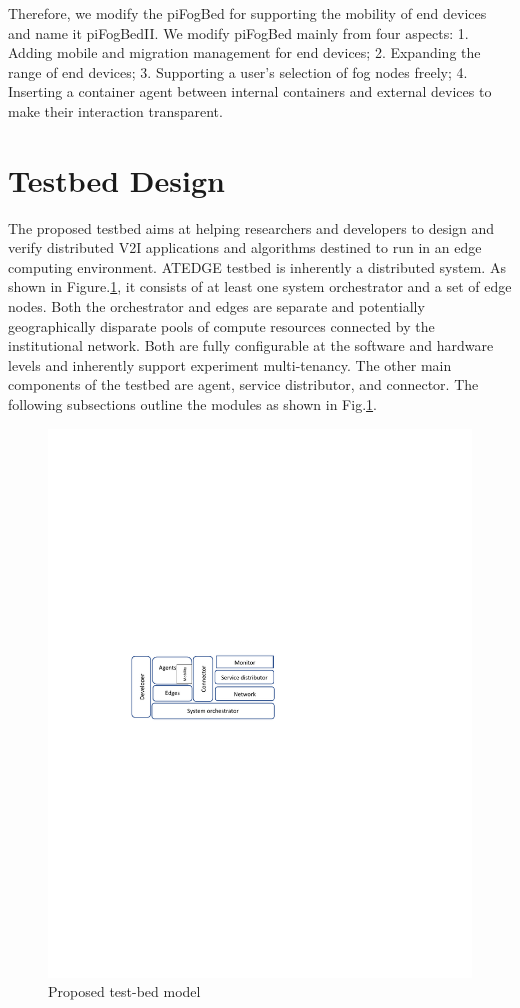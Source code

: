 \documentclass[conference]{IEEEtran}
\begin{document}
Therefore, we modify the piFogBed\cite{xu2020support} for supporting the mobility of end devices and name it
piFogBedII. We modify piFogBed mainly from four aspects:
1. Adding mobile and migration management for end devices;
2. Expanding the range of end devices;
3. Supporting a user’s selection of fog nodes freely;
4. Inserting a container agent between internal containers and external devices to make their
interaction transparent.
\section{Testbed Design}
\par The proposed testbed aims at helping researchers and developers to design and verify distributed
V2I applications and algorithms destined to run in an edge computing environment. ATEDGE testbed is inherently a distributed system. As shown in Figure.\ref{fig:model}, it consists of at least one system orchestrator
and a set of edge nodes. Both the orchestrator and edges are separate and potentially geographically disparate pools of
compute resources connected by the institutional network. Both are fully configurable at the software and hardware levels and inherently support experiment multi-tenancy. 
The other main components of the testbed are agent, service distributor, and connector. The following subsections outline the modules as shown in Fig.\ref{fig:model}.
\begin{figure}[!htbp]
\centering
\includegraphics[clip, trim=4cm 13.0cm 9.5cm 11.5cm, width=\columnwidth]{figures/model2.pdf}
\caption{Proposed test-bed model}
\label{fig:model}
\end{figure}
\end{document}
